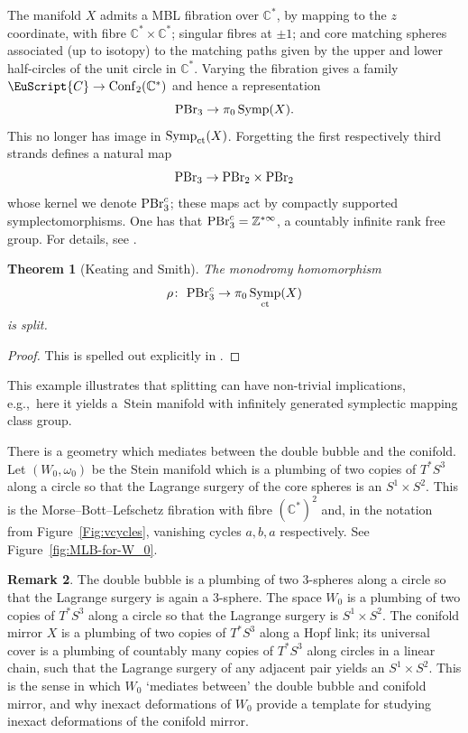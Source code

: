 \documentclass[pdftex]{sigma}
\newcommand{\scrC}{\EuScript{C}}
\DeclareMathOperator{\Symp}{Symp}
\def\bZ{\mathbb{Z}}
\def\bC{\mathbb{C}}
\newtheorem{thm}{Theorem}[section]
\theoremstyle{definition}
\newtheorem{rmk}[thm]{Remark}
\numberwithin{equation}{section}
\begin{document}
The manifold $X$ admits a MBL fibration over $\bC^*$, by mapping to the $z$ coordinate, with fibre $\bC^*\times \bC^*$; singular fibres at $\pm1$; and core matching spheres associated (up to isotopy) to the matching paths given by the upper and lower half-circles of the unit circle in $\bC^\ast$. Varying the fibration gives a family $\scrC \to \mathrm{Conf}_2(\bC^*)$ and hence a representation
\[
{\rm PBr}_3 \to \pi_0\Symp(X).
\]
This no longer has image in $\Symp_{\rm ct}(X)$. Forgetting the first respectively third strands defines a natural map
\[
{\rm PBr}_3 \to {\rm PBr}_2 \times {\rm PBr}_2
\]
whose kernel we denote ${\rm PBr}_3^c$; these maps act by compactly supported symplectomorphisms. One has that ${\rm PBr}_3^c = \bZ^{\ast \infty}$, a countably infinite rank free group. For details, see \cite[Section 3]{Keating-Smith}.

\begin{thm}[Keating and Smith]
The monodromy homomorphism
\[
\rho\colon \ {\rm PBr}_3^c \to \pi_0\Symp_{\rm ct}(X)
\]
is split.
\end{thm}

\begin{proof} This is spelled out explicitly in \cite[Theorem 1.1]{Keating-Smith}. \end{proof}

This example illustrates that splitting can have non-trivial implications, e.g.,~here it yields a~Stein manifold with infinitely generated symplectic mapping class group.

There is a geometry which mediates between the double bubble and the conifold. Let $(W_0,\omega_0)$ be the Stein manifold which is a plumbing of two copies of $T^*S^3$ along a circle so that the Lagrange surgery of the core spheres is an $S^1\times S^2$. This is the Morse--Bott--Lefschetz fibration with fibre $(\bC^*)^2$ and, in the notation from Figure~\ref{Fig:vcycles}, vanishing cycles $a,b,a$ respectively. See Figure~\ref{fig:MLB-for-W_0}.


\begin{rmk}
 The double bubble is a plumbing of two 3-spheres along a circle so that the Lagrange surgery is again a 3-sphere. The space $W_0$ is a plumbing of two copies of $T^*S^3$ along a circle so that the Lagrange surgery is $S^1\times S^2$. The conifold mirror $X$ is a plumbing of two copies of $T^*S^3$ along a Hopf link; its universal cover is a plumbing of countably many copies of $T^*S^3$ along circles in a linear chain, such that the Lagrange surgery of any adjacent pair yields an $S^1\times S^2$. This is the sense in which $W_0$ `mediates between' the double bubble and conifold mirror, and why inexact deformations of $W_0$ provide a template for studying inexact deformations of the conifold mirror.
\end{rmk}
\end{document}

